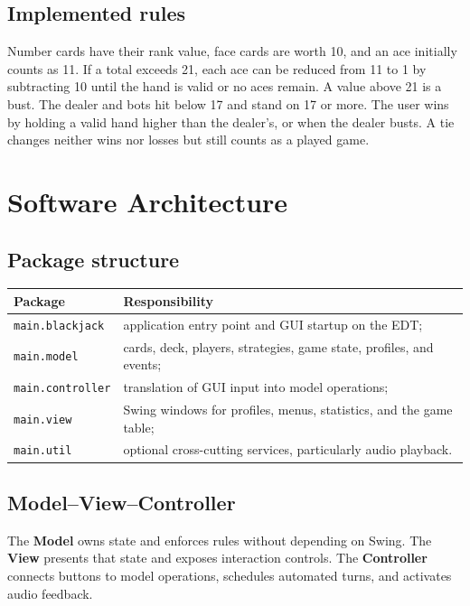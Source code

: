 \documentclass[11pt,a4paper]{report}
\newcommand{\code}[1]{\nolinkurl{#1}}
\begin{document}
\section{Implemented rules}

Number cards have their rank value, face cards are worth 10, and an ace initially
counts as 11. If a total exceeds 21, each ace can be reduced from 11 to 1 by
subtracting 10 until the hand is valid or no aces remain. A value above 21 is a bust.
The dealer and bots hit below 17 and stand on 17 or more. The user wins by holding a
valid hand higher than the dealer's, or when the dealer busts. A tie changes neither
wins nor losses but still counts as a played game.

\chapter{Software Architecture}

\section{Package structure}

\noindent\begin{tabularx}{\textwidth}{@{}lX@{}}
\toprule
\textbf{Package} & \textbf{Responsibility} \\
\midrule
\code{main.blackjack} & application entry point and GUI startup on the EDT; \\
\code{main.model} & cards, deck, players, strategies, game state, profiles, and events; \\
\code{main.controller} & translation of GUI input into model operations; \\
\code{main.view} & Swing windows for profiles, menus, statistics, and the game table; \\
\code{main.util} & optional cross-cutting services, particularly audio playback. \\
\bottomrule
\end{tabularx}

\section{Model--View--Controller}

The \textbf{Model} owns state and enforces rules without depending on Swing. The
\textbf{View} presents that state and exposes interaction controls. The
\textbf{Controller} connects buttons to model operations, schedules automated turns,
and activates audio feedback.
\end{document}
